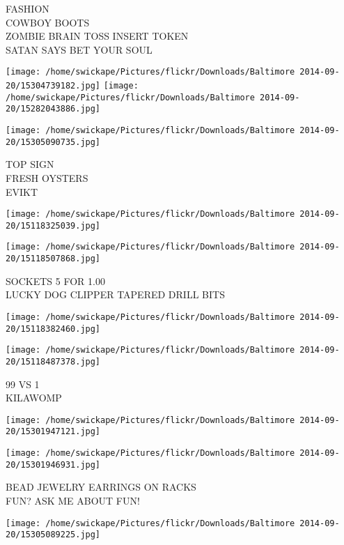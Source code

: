 \documentclass[10pt,letterpaper]{article}
\begin{document}
FASHION\\
COWBOY BOOTS\\
ZOMBIE BRAIN TOSS INSERT TOKEN\\
SATAN SAYS BET YOUR SOUL\\
\pagebreak

\texttt{[image: /home/swickape/Pictures/flickr/Downloads/Baltimore 2014-09-20/15304739182.jpg]}
\texttt{[image: /home/swickape/Pictures/flickr/Downloads/Baltimore 2014-09-20/15282043886.jpg]}

\texttt{[image: /home/swickape/Pictures/flickr/Downloads/Baltimore 2014-09-20/15305090735.jpg]}

TOP SIGN\\
FRESH OYSTERS\\
EVIKT\\
\pagebreak

\texttt{[image: /home/swickape/Pictures/flickr/Downloads/Baltimore 2014-09-20/15118325039.jpg]}

\vspace{0.25in}
\texttt{[image: /home/swickape/Pictures/flickr/Downloads/Baltimore 2014-09-20/15118507868.jpg]}

SOCKETS 5 FOR 1.00\\
LUCKY DOG CLIPPER TAPERED DRILL BITS\\
\pagebreak

\texttt{[image: /home/swickape/Pictures/flickr/Downloads/Baltimore 2014-09-20/15118382460.jpg]}

\vspace{0.25in}
\texttt{[image: /home/swickape/Pictures/flickr/Downloads/Baltimore 2014-09-20/15118487378.jpg]}

99 VS 1\\
KILAWOMP\\
\pagebreak

\texttt{[image: /home/swickape/Pictures/flickr/Downloads/Baltimore 2014-09-20/15301947121.jpg]}

\vspace{0.25in}
\texttt{[image: /home/swickape/Pictures/flickr/Downloads/Baltimore 2014-09-20/15301946931.jpg]}

BEAD JEWELRY EARRINGS ON RACKS\\
FUN?  ASK ME ABOUT FUN!\\
\pagebreak

\texttt{[image: /home/swickape/Pictures/flickr/Downloads/Baltimore 2014-09-20/15305089225.jpg]}
\end{document}

